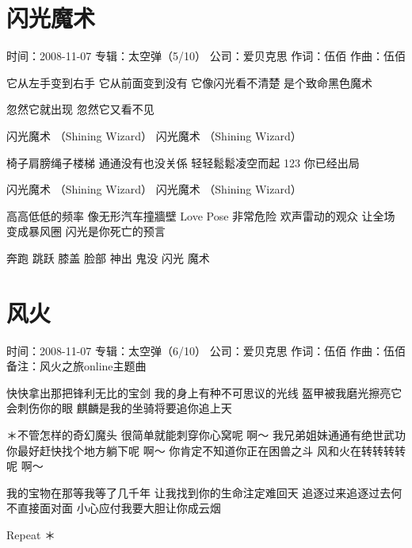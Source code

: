 \documentclass[UTF8,a4paper,oneside,twocolumn,12pt]{ctexbook}
\newcommand{\infopair}[2]{\textbullet #1：#2}
\newcommand{\zc}[1][伍佰]{\infopair{作词}{#1}}
\newcommand{\zq}[1][伍佰]{\infopair{作曲}{#1}}
\newcommand{\zj}[1]{\infopair{专辑}{#1}}
\newcommand{\sj}[1]{\infopair{时间}{#1}}
\newcommand{\bz}[1]{\infopair{备注}{#1}}
\newcommand{\gs}[1]{\infopair{公司}{#1}}
\newenvironment{info}{\begin{flushleft}\kaishu
	}
	{\end{flushleft}\normalsize\yahei\par}
\newenvironment{lyric}{
	}
{}
\begin{document}
\section{闪光魔术}
\begin{info}
	\sj{2008-11-07}
	\zj{太空弹（5/10）}
	\gs{爱贝克思}
	\zc
	\zq
\end{info}
\begin{lyric}
	它从左手变到右手
	它从前面变到没有
	它像闪光看不清楚
	是个致命黑色魔术

	忽然它就出现
	忽然它又看不见

	闪光魔术 （Shining Wizard）
	闪光魔术 （Shining Wizard）

	椅子肩膀绳子楼梯
	通通没有也没关係
	轻轻鬆鬆凌空而起
	123 你已经出局

	闪光魔术 （Shining Wizard）
	闪光魔术 （Shining Wizard）

	高高低低的频率 像无形汽车撞牆壁
	Love Pose 非常危险
	欢声雷动的观众 让全场变成暴风圈
	闪光是你死亡的预言

	奔跑 跳跃 膝盖 脸部
	神出 鬼没 闪光 魔术
\end{lyric}

\section{风火}
\begin{info}
	\sj{2008-11-07}
	\zj{太空弹（6/10）}
	\gs{爱贝克思}
	\zc
	\zq
	\bz{风火之旅online主题曲}
\end{info}
\begin{lyric}
	快快拿出那把锋利无比的宝剑
	我的身上有种不可思议的光线
	盔甲被我磨光擦亮它会刺伤你的眼
	麒麟是我的坐骑将要追你追上天

	＊不管怎样的奇幻魔头
	很简单就能刺穿你心窝呢 啊～
	我兄弟姐妹通通有绝世武功
	你最好赶快找个地方躺下呢 啊～
	你肯定不知道你正在困兽之斗
	风和火在转转转转呢 啊～

	我的宝物在那等我等了几千年
	让我找到你的生命注定难回天
	追逐过来追逐过去何不直接面对面
	小心应付我要大胆让你成云烟

	Repeat ＊
\end{lyric}
\end{document}
